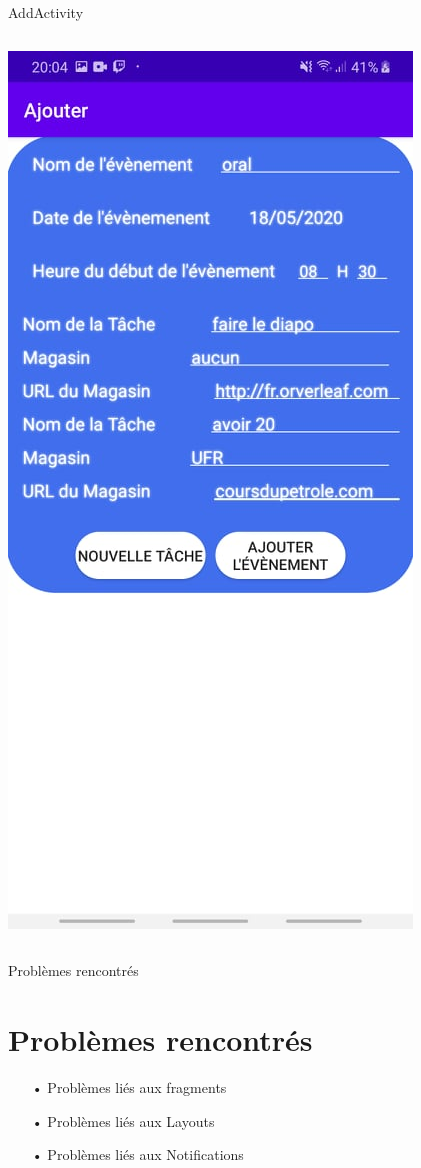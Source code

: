 \documentclass[11pt]{beamer}
\begin{document}
\begin{frame}{AddActivity}
\begin{columns}
\includegraphics[scale=0.4]{FormWTask}

\end{columns}

\end{frame}


\begin{frame}{Problèmes rencontrés}

\section{Problèmes rencontrés}
\begin{itemize}
\item[•] Problèmes liés aux fragments\pause
\item[•] Problèmes liés aux Layouts\pause
\item[•] Problèmes liés aux Notifications
\end{itemize}

\end{frame}
\end{document}
